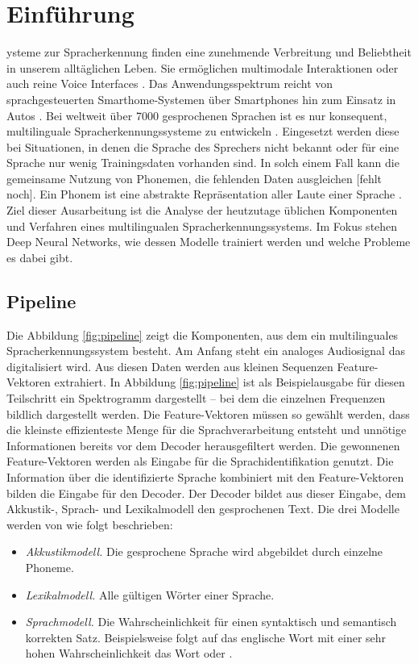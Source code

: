 \section{Einführung}\label{sec:introduction}
ysteme zur Spracherkennung finden eine zunehmende Verbreitung und Beliebtheit in unserem alltäglichen Leben.
Sie ermöglichen multimodale Interaktionen oder auch reine Voice Interfaces \cite{Harris.2004}.
Das Anwendungsspektrum reicht von sprachgesteuerten Smarthome-Systemen über Smartphones hin zum Einsatz in Autos \cite{Yu.2014}.
Bei weltweit über 7000 gesprochenen Sprachen ist es nur konsequent, multilinguale Spracherkennungssysteme zu entwickeln \cite{Gary.2018}.
Eingesetzt werden diese bei Situationen, in denen die Sprache des Sprechers nicht bekannt oder für eine Sprache nur wenig
Trainingsdaten vorhanden sind. In solch einem Fall kann die gemeinsame Nutzung von Phonemen, die fehlenden Daten ausgleichen [fehlt noch].
Ein Phonem ist eine abstrakte Repräsentation aller Laute einer Sprache .
Ziel dieser Ausarbeitung ist die Analyse der heutzutage üblichen Komponenten und Verfahren eines multilingualen Spracherkennungssystems.
Im Fokus stehen Deep Neural Networks, wie dessen Modelle trainiert werden und welche Probleme es dabei gibt.

\subsection{Pipeline}
Die Abbildung \ref{fig:pipeline} zeigt die Komponenten, aus dem ein multilinguales Spracherkennungssystem besteht.
Am Anfang steht ein analoges Audiosignal das digitalisiert wird. Aus diesen Daten werden aus kleinen Sequenzen
Feature-Vektoren extrahiert. In Abbildung \ref{fig:pipeline} ist als Beispielausgabe für diesen Teilschritt ein Spektrogramm dargestellt – bei dem die einzelnen Frequenzen bildlich dargestellt werden.
Die Feature-Vektoren müssen so gewählt werden, dass die kleinste effizienteste Menge für die Sprachverarbeitung
entsteht und unnötige Informationen bereits vor dem Decoder herausgefiltert werden.
Die gewonnenen Feature-Vektoren werden als Eingabe für die Sprachidentifikation genutzt. Die Information
über die identifizierte Sprache kombiniert mit den Feature-Vektoren bilden die Eingabe für den Decoder. Der Decoder bildet aus dieser Eingabe,
dem Akkustik-, Sprach- und Lexikalmodell den gesprochenen Text. Die drei Modelle werden von \cite{Tom.2016} wie folgt beschrieben:

\begin{itemize}
    \item \textit{Akkustikmodell.} Die gesprochene Sprache wird abgebildet durch einzelne Phoneme.
    \item \textit{Lexikalmodell.} Alle gültigen Wörter einer Sprache.
    \item \textit{Sprachmodell.} Die Wahrscheinlichkeit für einen syntaktisch und semantisch korrekten Satz.
            Beispielsweise folgt auf das englische Wort \grqq{} mit einer sehr hohen Wahrscheinlichkeit das Wort \grqq{} oder
        \grqq{}.
\end{itemize}

